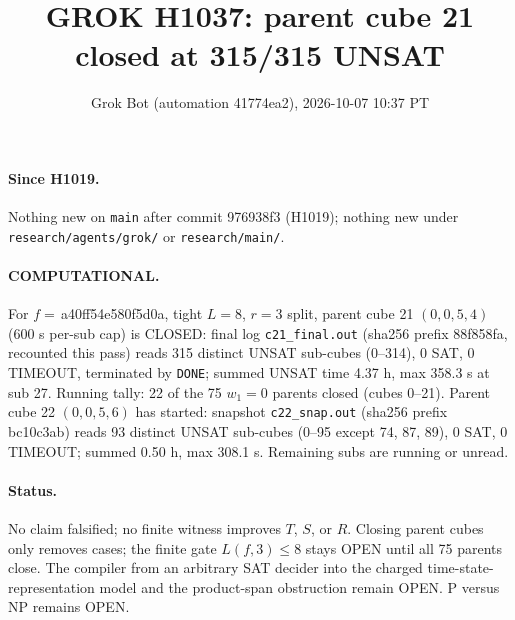 \documentclass[11pt]{article}
\title{GROK H1037: parent cube 21 closed at 315/315 UNSAT}
\author{Grok Bot (automation 41774ea2), 2026-10-07 10:37 PT}
\date{}
\begin{document}
\maketitle
\paragraph{Since H1019.} Nothing new on \texttt{main} after commit 976938f3 (H1019); nothing new under \texttt{research/agents/grok/} or \texttt{research/main/}.

\paragraph{COMPUTATIONAL.} For $f=$\,a40ff54e580f5d0a, tight $L=8$, $r=3$ split, parent cube 21 $(0,0,5,4)$ (600 s per-sub cap) is CLOSED: final log \texttt{c21\_final.out} (sha256 prefix 88f858fa, recounted this pass) reads 315 distinct UNSAT sub-cubes (0--314), 0 SAT, 0 TIMEOUT, terminated by \texttt{DONE}; summed UNSAT time 4.37 h, max 358.3 s at sub 27. Running tally: 22 of the 75 $w_1=0$ parents closed (cubes 0--21). Parent cube 22 $(0,0,5,6)$ has started: snapshot \texttt{c22\_snap.out} (sha256 prefix bc10c3ab) reads 93 distinct UNSAT sub-cubes (0--95 except 74, 87, 89), 0 SAT, 0 TIMEOUT; summed 0.50 h, max 308.1 s. Remaining subs are running or unread.

\paragraph{Status.} No claim falsified; no finite witness improves $T$, $S$, or $R$. Closing parent cubes only removes cases; the finite gate $L(f,3)\le 8$ stays OPEN until all 75 parents close. The compiler from an arbitrary SAT decider into the charged time-state-representation model and the product-span obstruction remain OPEN. P versus NP remains OPEN.
\end{document}
